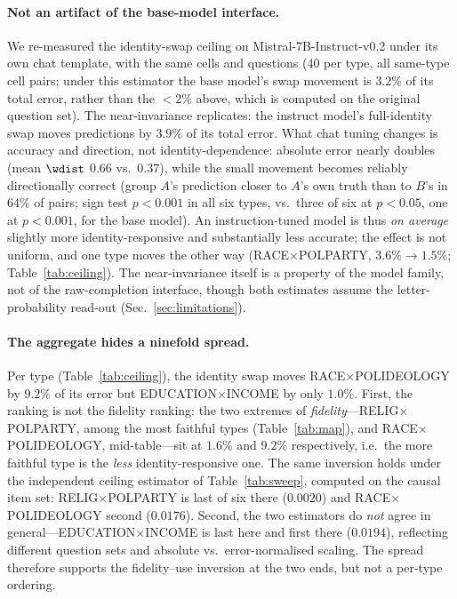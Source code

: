 \paragraph{Not an artifact of the base-model interface.} We re-measured
the identity-swap ceiling on Mistral-7B-Instruct-v0.2 under its own chat
template, with the same cells and questions (40 per type, all same-type
cell pairs; under this estimator the base model's swap movement is
$3.2\%$ of its total error, rather than the ${<}2\%$ above, which is
computed on the original question set). The near-invariance replicates:
the instruct model's full-identity swap moves predictions by $3.9\%$ of
its total error. What chat tuning changes is accuracy and direction, not
identity-dependence: absolute error nearly doubles (mean $\wdist$
$0.66$ vs.\ $0.37$), while the small movement becomes reliably
directionally correct (group $A$'s prediction closer to $A$'s own truth
than to $B$'s in $64\%$ of pairs; sign test $p<0.001$ in all six types,
vs.\ three of six at $p<0.05$, one at $p<0.001$, for the base model). An
instruction-tuned model is thus \emph{on average} slightly more
identity-responsive and substantially less accurate; the effect is not
uniform, and one type moves the other way
(RACE$\times$POLPARTY, $3.6\%\!\to\!1.5\%$; Table~\ref{tab:ceiling}). The
near-invariance itself is a property of the model family, not of the
raw-completion interface, though both estimates assume the
letter-probability read-out (Sec.~\ref{sec:limitations}).

\paragraph{The aggregate hides a ninefold spread.}
Per type (Table~\ref{tab:ceiling}), the identity swap moves
RACE$\times$POLIDEOLOGY by $9.2\%$ of its error but
EDUCATION$\times$INCOME by only $1.0\%$. First, the ranking is not the
fidelity ranking: the two extremes
of \emph{fidelity}---RELIG$\times$POLPARTY, among the most faithful types
(Table~\ref{tab:map}), and RACE$\times$POLIDEOLOGY, mid-table---sit at
$1.6\%$ and $9.2\%$ respectively, i.e.\ the more faithful type is the
\emph{less} identity-responsive one. The same inversion holds under the
independent ceiling estimator of Table~\ref{tab:sweep}, computed on the
causal item set: RELIG$\times$POLPARTY is last of six there ($0.0020$)
and RACE$\times$POLIDEOLOGY second ($0.0176$). Second, the two estimators
do \emph{not} agree in general---EDUCATION$\times$INCOME is last here and
first there ($0.0194$), reflecting different question sets and absolute
vs.\ error-normalised scaling. The spread therefore supports the
fidelity--use inversion at the two ends, but not a per-type ordering.

